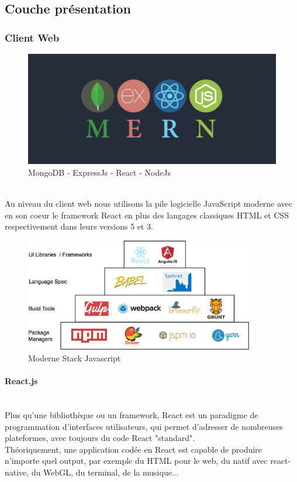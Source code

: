 \subsection{Couche présentation} 
\subsubsection{Client Web}
\begin{figure}[H]
	\begin{center}
		\includegraphics[width=14cm]{images/techno/mern.png}
	\end{center}
	\caption{MongoDB - ExpressJs - React - NodeJs}
\end{figure}
$ $\\Au niveau du client web nous utilisons la pile logicielle JavaScript moderne avec en son coeur le framework React en plus des langages classiques HTML et CSS respectivement dans leurs versions 5 et 3.
\begin{figure}[H]
	\begin{center}
		\includegraphics[width=10cm]{images/techno/jsarchi.png}
	\end{center}
	\caption{Moderne Stack Javascript}
\end{figure}

\paragraph{React.js} 
$ $\\Plus qu'une bibliothèque ou un framework, React est un paradigme de programmation d'interfaces utilisateurs, qui permet d'adresser de nombreuses plateformes, avec toujours du code React "standard".
\\Théoriquement, une application codée en React est capable de produire n'importe quel output, par exemple du HTML pour le web, du natif avec react-native, du WebGL, du terminal, de la musique...

